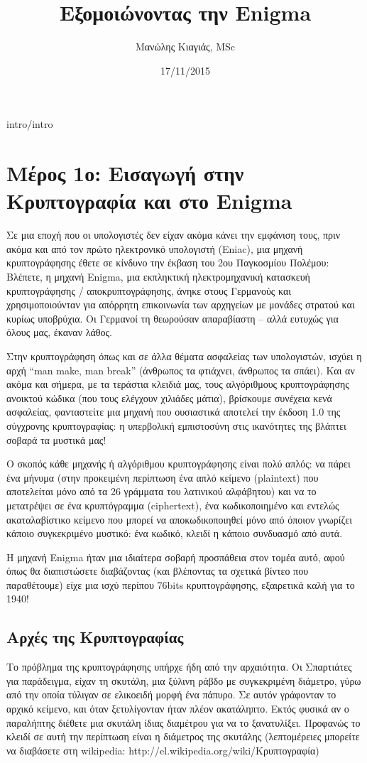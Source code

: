 \documentclass[a4paper,twoside,12pt]{article}
\author{Μανώλης Κιαγιάς, MSc}
\title {Εξομοιώνοντας την Enigma}
\date{17/11/2015}
\begin{document}
%
\maketitle
%
\cleardoublepage
%
 {intro/intro}
%
\section{Μέρος 1ο: Εισαγωγή στην Κρυπτογραφία και στο Enigma}
%
Σε μια εποχή που οι υπολογιστές δεν είχαν ακόμα κάνει την εμφάνιση τους, πριν ακόμα και από τον πρώτο ηλεκτρονικό υπολογιστή (Eniac), μια μηχανή κρυπτογράφησης έθετε σε κίνδυνο την έκβαση του 2ου Παγκοσμίου Πολέμου: Βλέπετε, η μηχανή Enigma, μια εκπληκτική ηλεκτρομηχανική κατασκευή κρυπτογράφησης / αποκρυπτογράφησης, άνηκε στους Γερμανούς και χρησιμοποιούνταν για απόρρητη επικοινωνία των αρχηγείων με μονάδες στρατού και κυρίως υποβρύχια. Οι Γερμανοί τη θεωρούσαν απαραβίαστη – αλλά ευτυχώς για όλους μας, έκαναν λάθος.

Στην κρυπτογράφηση όπως και σε άλλα θέματα ασφαλείας των υπολογιστών, ισχύει η αρχή ``man make, man break'' (άνθρωπος τα φτιάχνει, άνθρωπος τα σπάει). Και αν ακόμα και σήμερα, με τα τεράστια κλειδιά μας, τους αλγόριθμους κρυπτογράφησης ανοικτού κώδικα (που τους ελέγχουν χιλιάδες μάτια), βρίσκουμε συνέχεια κενά ασφαλείας, φανταστείτε μια μηχανή που ουσιαστικά αποτελεί την έκδοση 1.0 της σύγχρονης κρυπτογραφίας: η υπερβολική εμπιστοσύνη στις ικανότητες της βλάπτει σοβαρά τα μυστικά μας!

Ο σκοπός κάθε μηχανής ή αλγόριθμου κρυπτογράφησης είναι πολύ απλός: να πάρει ένα μήνυμα (στην προκειμένη περίπτωση ένα απλό κείμενο (plaintext) που αποτελείται μόνο από τα 26 γράμματα του λατινικού αλφάβητου) και να το μετατρέψει σε ένα κρυπτόγραμμα (ciphertext), ένα κωδικοποιημένο και εντελώς ακαταλαβίστικο κείμενο που μπορεί να αποκωδικοποιηθεί μόνο από όποιον γνωρίζει κάποιο συγκεκριμένο μυστικό: ένα κωδικό, κλειδί η κάποιο συνδυασμό από αυτά. 

Η μηχανή Enigma ήταν μια ιδιαίτερα σοβαρή προσπάθεια στον τομέα αυτό, αφού όπως θα διαπιστώσετε διαβάζοντας (και βλέποντας τα σχετικά βίντεο που παραθέτουμε) είχε μια ισχύ περίπου 76bits κρυπτογράφησης, εξαιρετικά καλή για το 1940!

\subsection{Αρχές της Κρυπτογραφίας}

Το πρόβλημα της κρυπτογράφησης υπήρχε ήδη από την αρχαιότητα. Οι Σπαρτιάτες για παράδειγμα, είχαν τη σκυτάλη, μια ξύλινη ράβδο με συγκεκριμένη διάμετρο, γύρω από την οποία τύλιγαν σε ελικοειδή μορφή ένα πάπυρο. Σε αυτόν γράφονταν το αρχικό κείμενο, και όταν ξετυλίγονταν ήταν πλέον ακατάληπτο. Εκτός φυσικά αν ο παραλήπτης διέθετε μια σκυτάλη ίδιας διαμέτρου για να το ξανατυλίξει. Προφανώς το κλειδί σε αυτή την περίπτωση είναι η διάμετρος της σκυτάλης (λεπτομέρειες μπορείτε να διαβάσετε στη wikipedia: http://el.wikipedia.org/wiki/Κρυπτογραφία)
\end{document}
